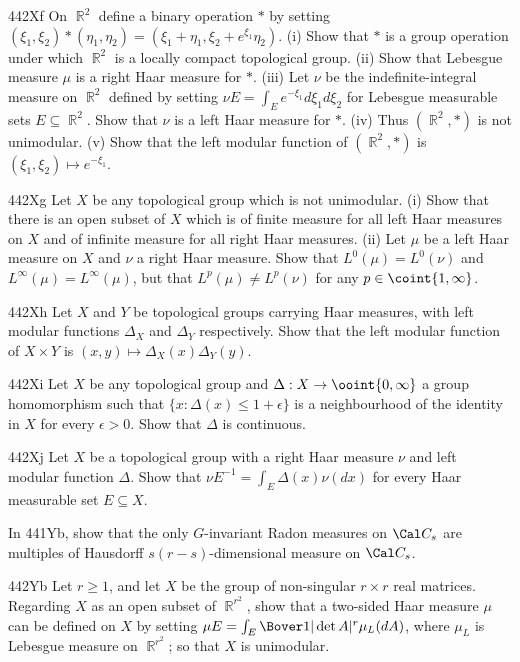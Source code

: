 {\sqheader 442Xf On $\BbbR^2$ define a binary operation $*$ by setting
$(\xi_1,\xi_2)*(\eta_1,\eta_2)=(\xi_1+\eta_1,\xi_2+e^{\xi_1}\eta_2)$.
(i) Show that $*$ is a group operation under which $\BbbR^2$ is a
locally compact topological group.   (ii) Show that Lebesgue measure
$\mu$ is a right Haar measure for $*$.   (iii) Let $\nu$
be the indefinite-integral measure on $\BbbR^2$ defined by setting $\nu
E=\int_Ee^{-\xi_1}d\xi_1d\xi_2$ for Lebesgue measurable sets
$E\subseteq\BbbR^2$.   Show that $\nu$ is a left Haar measure for $*$.
(iv) Thus $(\BbbR^2,*)$ is not unimodular.   (v) Show that the left
modular function of $(\BbbR^2,*)$ is $(\xi_1,\xi_2)\mapsto e^{-\xi_1}$.

\sqheader 442Xg Let $X$ be any topological group which is not
unimodular.   (i) Show that there is an open subset of $X$ which is of
finite measure for all left Haar measures on $X$ and of infinite measure
for all right Haar measures.   
(ii) Let $\mu$ be a left Haar measure on $X$ and $\nu$ a right Haar
measure.   Show that $L^0(\mu)=L^0(\nu)$ and
$L^{\infty}(\mu)=L^{\infty}(\mu)$, but that $L^p(\mu)\ne L^p(\nu)$ for
any $p\in\coint{1,\infty}$.

\spheader 442Xh Let $X$ and $Y$ be topological groups carrying Haar
measures, with left modular functions $\Delta_X$ and $\Delta_Y$
respectively.   Show that the left modular function of $X\times Y$ is
$(x,y)\mapsto\Delta_X(x)\Delta_Y(y)$.

\spheader 442Xi Let $X$ be any topological group and
$\Delta:X\to\ooint{0,\infty}$ a group homomorphism such that
$\{x:\Delta(x)\le 1+\epsilon\}$ is a neighbourhood of the identity in
$X$ for every $\epsilon>0$.    Show that $\Delta$ is continuous.

\spheader 442Xj Let $X$ be a topological group with a right Haar measure
$\nu$ and left modular function $\Delta$.   Show that
$\nu E^{-1}=\int_E\Delta(x)\nu(dx)$ for every Haar measurable set
$E\subseteq X$.

In 441Yb, show that the only $G$-invariant Radon measures on $\Cal C_s$
are multiples of Hausdorff $s(r-s)$-dimensional measure on $\Cal C_s$.

\spheader 442Yb Let $r\ge 1$, and let $X$ be the group of
non-singular $r\times r$ real matrices.   Regarding $X$ as an open
subset of
$\BbbR^{r^2}$, show that a two-sided Haar measure $\mu$ can be defined
on $X$ by setting $\mu E=\int_E\Bover1{|\det A|^r}\mu_L(dA)$, where
$\mu_L$ is Lebesgue measure on $\BbbR^{r^2}$;  so that $X$ is
unimodular.

}
